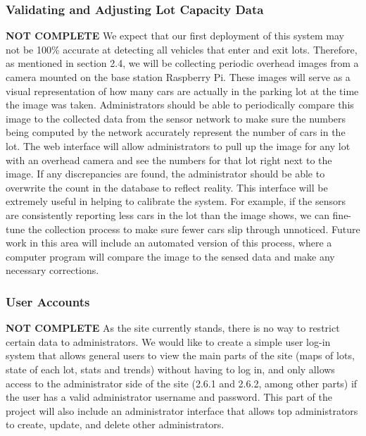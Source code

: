 \documentclass[11pt, oneside, fullpage, doublespace]{article}
\begin{document}
\subsubsection{Validating and Adjusting Lot Capacity Data}
{\color{red}\textbf{NOT COMPLETE}}
We expect that our first deployment of this system may not be 100\% accurate at detecting all vehicles that enter and exit lots. Therefore, as mentioned in section 2.4, we will be collecting periodic overhead images from a camera mounted on the base station Raspberry Pi. These images will serve as a visual representation of how many cars are actually in the parking lot at the time the image was taken. Administrators should be able to periodically compare this image to the collected data from the sensor network to make sure the numbers being computed by the network accurately represent the number of cars in the lot. The web interface will allow administrators to pull up the image for any lot with an overhead camera and see the numbers for that lot right next to the image. If any discrepancies are found, the administrator should be able to overwrite the count in the database to reflect reality. This interface will be extremely useful in helping to calibrate the system. For example, if the sensors are consistently reporting less cars in the lot than the image shows, we can fine-tune the collection process to make sure fewer cars slip through unnoticed. Future work in this area will include an automated version of this process, where a computer program will compare the image to the sensed data and make any necessary corrections.

\subsubsection{User Accounts}
{\color{red}\textbf{NOT COMPLETE}}
As the site currently stands, there is no way to restrict certain data to administrators. We would like to create a simple user log-in system that allows general users to view the main parts of the site (maps of lots, state of each lot, stats and trends) without having to log in, and only allows access to the administrator side of the site (2.6.1 and 2.6.2, among other parts) if the user has a valid administrator username and password. This part of the project will also include an administrator interface that allows top administrators to create, update, and delete other administrators.
\end{document}
